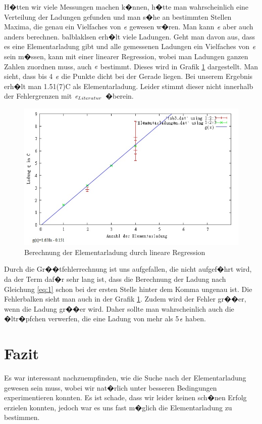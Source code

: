\documentclass{scrartcl}
\begin{document}
H�tten wir viele Messungen machen k�nnen, h�tte man wahrscheinlich eine Verteilung der Ladungen gefunden und man s�he an bestimmten Stellen Maxima, die genau ein Vielfaches von $\emph{e}$ gewesen w�ren. Man kann $\emph{e}$ aber auch anders berechnen. balblaklsen erh�lt viele Ladungen. Geht man davon aus, dass es eine Elementarladung gibt und alle gemessenen Ladungen ein Vielfaches von $\emph{e}$ sein m�ssen, kann mit einer linearer Regression, wobei man Ladungen ganzen Zahlen zuordnen muss, auch $\emph{e}$ bestimmt. Dieses wird in Grafik \ref{fig:ausw} dargestellt. Man sieht, dass bis 4 $\emph{e}$ die Punkte dicht bei der Gerade liegen. Bei unserem Ergebnis erh�lt man 1.51(7)C als Elementarladung. Leider stimmt dieser nicht innerhalb der Fehlergrenzen mit $\emph{e}_{Literatur}$ �berein.
\begin{figure}%
\includegraphics[width=15cm]{pics/ausw}%
\caption{Berechnung der Elementarladung durch lineare Regression}%
\label{fig:ausw}%
\end{figure}
Durch die Gr��tfehlerrechnung ist uns aufgefallen, die nicht aufgef�hrt wird, da der Term daf�r sehr lang ist, dass die Berechnung der Ladung nach Gleichung \ref{eq:1} schon bei der ersten Stelle hinter dem Komma ungenau ist. Die Fehlerbalken sieht man auch in der Grafik \ref{fig:ausw}. Zudem wird der Fehler gr��er, wenn die Ladung gr��er wird. Daher sollte man wahrscheinlich auch die �ltr�pfchen verwerfen, die eine Ladung von mehr als 5$\emph{e}$ haben.

\section{Fazit}
Es war interessant nachzuempfinden, wie die Suche nach der Elementarladung gewesen sein muss, wobei wir nat�rlich unter besseren Bedingungen experimentieren konnten. Es ist schade, dass wir leider keinen sch�nen Erfolg erzielen konnten, jedoch war es uns fast m�glich die Elementarladung zu bestimmen.
 
\end{document}
